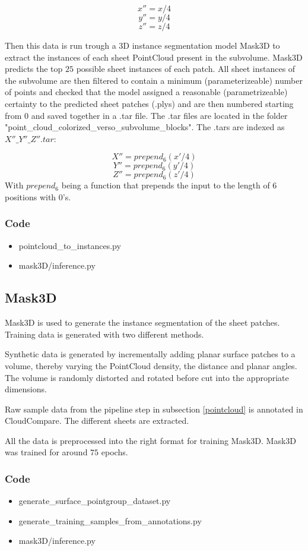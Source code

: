 \documentclass[peerreview]{IEEEtran}
\begin{document}
\[
x'' = x / 4
\]
\[
y'' = y / 4
\]
\[
z'' = z / 4
\]

Then this data is run trough a 3D instance segmentation model Mask3D\cite{mask3d} to extract the instances of each sheet PointCloud present in the subvolume. Mask3D predicts the top $25$ possible sheet instances of each patch. All sheet instances of the subvolume are then filtered to contain a minimum (parameterizeable) number of points and checked that the model assigned a reasonable (parametrizeable) certainty to the predicted sheet patches (.plys) and are then numbered starting from $0$ and saved together in a .tar file. The .tar files are located in the folder "point\_cloud\_colorized\_verso\_subvolume\_blocks". The .tars are indexed as $X''\_Y''\_Z''.tar$:

\[
X'' = prepend_6(x' / 4)
\]
\[
Y'' = prepend_6(y' / 4)
\]
\[
Z'' = prepend_6(z' / 4)
\]
With $prepend_6$ being a function that prepends the input to the length of $6$ positions with $0$'s.

\subsubsection{Code}
\begin{itemize}
    \item pointcloud\_to\_instances.py
    \item mask3D/inference.py
\end{itemize}

\subsection{Mask3D}
Mask3D \cite{mask3d} is used to generate the instance segmentation of the sheet patches. Training data is generated with two different methods.

Synthetic data is generated by incrementally adding planar surface patches to a volume, thereby varying the PointCloud density, the distance and planar angles. The volume is randomly distorted and rotated before cut into the appropriate dimensions.

Raw sample data from the pipeline step in subsection \ref{pointcloud} is annotated in CloudCompare. The different sheets are extracted. 

All the data is preprocessed into the right format for training Mask3D. Mask3D was trained for around $75$ epochs.

\subsubsection{Code}
\begin{itemize}
    \item generate\_surface\_pointgroup\_dataset.py
    \item generate\_training\_samples\_from\_annotations.py
    \item mask3D/inference.py
\end{itemize}
\end{document}
